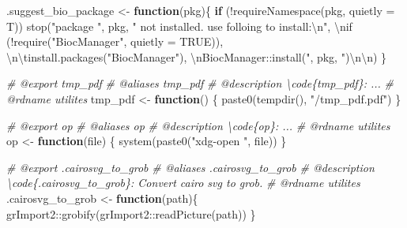 \documentclass[
]{article}
\newenvironment{Shaded}{\begin{snugshade}}{\end{snugshade}}
\newcommand{\AttributeTok}[1]{\textcolor[rgb]{0.77,0.63,0.00}{#1}}
\newcommand{\CommentTok}[1]{\textcolor[rgb]{0.56,0.35,0.01}{\textit{#1}}}
\newcommand{\ControlFlowTok}[1]{\textcolor[rgb]{0.13,0.29,0.53}{\textbf{#1}}}
\newcommand{\FunctionTok}[1]{\textcolor[rgb]{0.00,0.00,0.00}{#1}}
\newcommand{\NormalTok}[1]{#1}
\newcommand{\OtherTok}[1]{\textcolor[rgb]{0.56,0.35,0.01}{#1}}
\newcommand{\SpecialCharTok}[1]{\textcolor[rgb]{0.00,0.00,0.00}{#1}}
\newcommand{\StringTok}[1]{\textcolor[rgb]{0.31,0.60,0.02}{#1}}
\begin{document}
\begin{Shaded}
\begin{Highlighting}[]
\NormalTok{.suggest\_bio\_package }\OtherTok{\textless{}{-}} 
  \ControlFlowTok{function}\NormalTok{(pkg)\{}
    \ControlFlowTok{if}\NormalTok{ (}\SpecialCharTok{!}\FunctionTok{requireNamespace}\NormalTok{(pkg, }\AttributeTok{quietly =}\NormalTok{ T))}
      \FunctionTok{stop}\NormalTok{(}\StringTok{"package \textquotesingle{}"}\NormalTok{, pkg, }\StringTok{"\textquotesingle{} not installed. use folloing to install:}\SpecialCharTok{\textbackslash{}n}\StringTok{"}\NormalTok{,}
           \StringTok{\textquotesingle{}}\SpecialCharTok{\textbackslash{}n}\StringTok{if (!require("BiocManager", quietly = TRUE))\textquotesingle{}}\NormalTok{,}
           \StringTok{\textquotesingle{}}\SpecialCharTok{\textbackslash{}n\textbackslash{}t}\StringTok{install.packages("BiocManager")\textquotesingle{}}\NormalTok{,}
           \StringTok{\textquotesingle{}}\SpecialCharTok{\textbackslash{}n}\StringTok{BiocManager::install("\textquotesingle{}}\NormalTok{, pkg, }\StringTok{\textquotesingle{}")}\SpecialCharTok{\textbackslash{}n\textbackslash{}n}\StringTok{\textquotesingle{}}\NormalTok{)}
\NormalTok{  \}}

\CommentTok{\#\textquotesingle{} @export tmp\_pdf}
\CommentTok{\#\textquotesingle{} @aliases tmp\_pdf}
\CommentTok{\#\textquotesingle{} @description \textbackslash{}code\{tmp\_pdf\}: ...}
\CommentTok{\#\textquotesingle{} @rdname utilites}
\NormalTok{tmp\_pdf }\OtherTok{\textless{}{-}} \ControlFlowTok{function}\NormalTok{() \{}
  \FunctionTok{paste0}\NormalTok{(}\FunctionTok{tempdir}\NormalTok{(), }\StringTok{"/tmp\_pdf.pdf"}\NormalTok{)}
\NormalTok{\}}

\CommentTok{\#\textquotesingle{} @export op}
\CommentTok{\#\textquotesingle{} @aliases op}
\CommentTok{\#\textquotesingle{} @description \textbackslash{}code\{op\}: ...}
\CommentTok{\#\textquotesingle{} @rdname utilites}
\NormalTok{op }\OtherTok{\textless{}{-}} \ControlFlowTok{function}\NormalTok{(file) \{}
  \FunctionTok{system}\NormalTok{(}\FunctionTok{paste0}\NormalTok{(}\StringTok{"xdg{-}open "}\NormalTok{, file))}
\NormalTok{\}}

\CommentTok{\#\textquotesingle{} @export .cairosvg\_to\_grob}
\CommentTok{\#\textquotesingle{} @aliases .cairosvg\_to\_grob}
\CommentTok{\#\textquotesingle{} @description \textbackslash{}code\{.cairosvg\_to\_grob\}: Convert cairo svg to \textquotesingle{}grob\textquotesingle{}.}
\CommentTok{\#\textquotesingle{} @rdname utilites}
\NormalTok{.cairosvg\_to\_grob }\OtherTok{\textless{}{-}} 
  \ControlFlowTok{function}\NormalTok{(path)\{}
\NormalTok{    grImport2}\SpecialCharTok{::}\FunctionTok{grobify}\NormalTok{(grImport2}\SpecialCharTok{::}\FunctionTok{readPicture}\NormalTok{(path))}
\NormalTok{  \}}


\end{Highlighting}
\end{Shaded}
\end{document}

